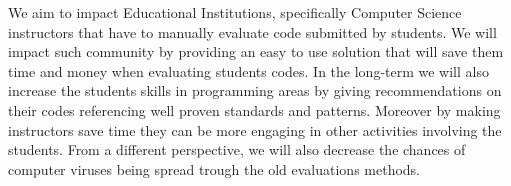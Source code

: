  We aim to impact Educational Institutions,
specifically Computer Science instructors that have to manually evaluate code
submitted by students. We will impact such community by providing an easy to use
solution that will save them time and money when evaluating students codes. In
the long-term we will also increase the students skills in programming areas by
giving recommendations on their codes referencing well proven standards and
patterns. Moreover by making instructors save time they can be more engaging in
other activities involving the students. From a different perspective, we will
also decrease the chances of computer viruses being spread trough the old
evaluations methods.
